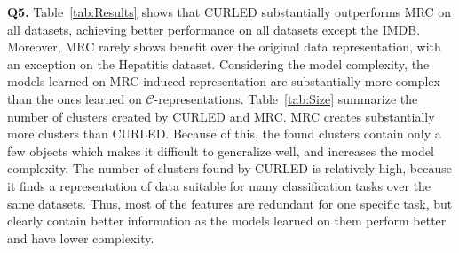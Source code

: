 \begin{table}
\captionsetup{justification=centerlast}
\begin{center}
	\caption{Model selection results. For each dataset, a selected parameters are reported together with the accuracies on the training and test sets. The first element indicates the selected clustering algorithm (S-spectral, H-hierarchical), the second one the clustering selection criteria, while the last one indicates the hyperedge similarity (C-combination, M-merging). The last column indicates the performance on the original data representation. }
    \label{tab:MS}

\end{center}

\end{table}




\textbf{Q5.}
Table~\ref{tab:Results} shows that CURLED substantially outperforms MRC on all datasets, achieving better performance on all datasets except the IMDB.
Moreover, MRC rarely shows benefit over the original data representation, with an exception on the Hepatitis dataset.
Considering the model complexity, the models learned on MRC-induced representation are substantially more complex than the ones learned on $\mathcal{C}$-representations.
Table~\ref{tab:Size} summarize the number of clusters created by CURLED and MRC.
MRC creates substantially more clusters than CURLED. 
Because of this, the found clusters contain only a few objects which makes it difficult to generalize well, and increases the model complexity.
The number of clusters found by CURLED is relatively high, because it finds a representation of data suitable for many classification tasks over the same datasets.
Thus, most of the features are redundant for one specific task, but clearly contain better information as the models learned on them perform better and have lower complexity.



